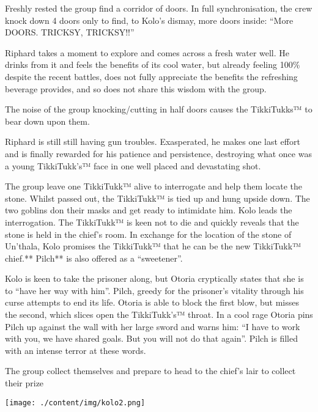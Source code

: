 Freshly rested the group find a corridor of doors. In full synchronisation, the crew knock down 4 doors only to find, to Kolo’s dismay, more doors inside: “More DOORS. TRICKSY, TRICKSY!!”\medskip

Riphard takes a moment to explore and comes across a fresh water well. He drinks from it and feels the benefits of its cool water, but already feeling 100\% despite the recent battles, does not fully appreciate the benefits the refreshing beverage provides, and so does not share this wisdom with the group.\medskip

The noise of the group knocking/cutting in half doors causes the TikkiTukks™ to bear down upon them.\medskip

Riphard is still still having gun troubles. Exasperated, he makes one last effort and is finally rewarded for his patience and persistence, destroying what once was a young TikkiTukk's™ face in one well placed and devastating shot.\medskip

The group leave one TikkiTukk™ alive to interrogate and help them locate the stone. Whilst passed out, the TikkiTukk™ is tied up and hung upside down. The two goblins don their masks and get ready to intimidate him. Kolo leads the interrogation. The TikkiTukk™ is keen not to die and quickly reveals that the stone is held in the chief’s room. In exchange for the location of the stone of Un'thala, Kolo promises the TikkiTukk™ that he can be the new TikkiTukk™ chief.** Pilch** is also offered as a “sweetener”.\medskip

Kolo is keen to take the prisoner along, but Otoria cryptically states that she is to “have her way with him”. Pilch, greedy for the prisoner’s vitality through his curse attempts to end its life. Otoria is able to block the first blow, but misses the second, which slices open the TikkiTukk’s™ throat. In a cool rage Otoria pins Pilch up against the wall with her large sword and warns him: “I have to work with you, we have shared goals. But you will not do that again”. Pilch is filled with an intense terror at these words.\medskip

The group collect themselves and prepare to head to the chief’s lair to collect their prize

\begin{center}
\texttt{[image: ./content/img/kolo2.png]}
\begin{figure}[h]
\end{figure}
\end{center}

\clearpage


